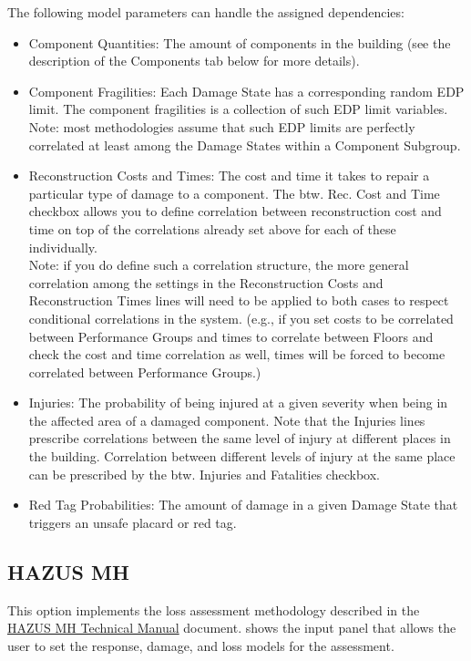 The following model parameters can handle the assigned dependencies:
\begin{itemize}
	\item Component Quantities: The amount of components in the building (see the description of the Components tab below for more details).
	\item Component Fragilities: Each Damage State has a corresponding random EDP limit. The component fragilities is a collection of such EDP limit variables.\\
	Note: most methodologies assume that such EDP limits are perfectly correlated at least among the Damage States within a Component Subgroup.
	\item Reconstruction Costs and Times: The cost and time it takes to repair a particular type of damage to a component. The btw. Rec. Cost and Time checkbox allows you to define correlation between reconstruction cost and time on top of the correlations already set above for each of these individually. \\
	Note: if you do define such a correlation structure, the more general correlation among the settings in the Reconstruction Costs and Reconstruction Times lines will need to be applied to both cases to respect conditional correlations in the system. (e.g., if you set costs to be correlated between Performance Groups and times to correlate between Floors and check the cost and time correlation as well, times will be forced to become correlated between Performance Groups.)
	\item Injuries: The probability of being injured at a given severity when being in the affected area of a damaged component. Note that the Injuries lines prescribe correlations between the same level of injury at different places in the building. Correlation between different levels of injury at the same place can be prescribed by the btw. Injuries and Fatalities checkbox.
	\item Red Tag Probabilities: The amount of damage in a given Damage State that triggers an unsafe placard or red tag.
\end{itemize}

\subsection{HAZUS MH}

This option implements the loss assessment methodology described in the \href{https://www.fema.gov/media-library-data/20130726-1820-25045-6286/hzmh2_1_eq_tm.pdf}{HAZUS MH Technical Manual} document.  shows the input panel that allows the user to set the response, damage, and loss models for the assessment.

